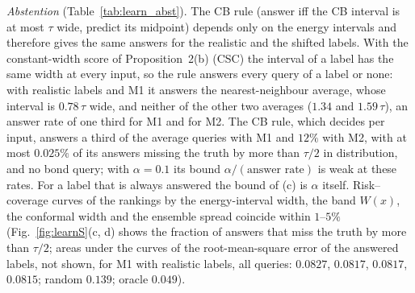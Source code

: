 \documentclass[aps,prx,onecolumn,10pt,nofootinbib,longbibliography,floatfix]{revtex4-2}
\theoremstyle{remark}
\begin{document}
\emph{Abstention} (Table~\ref{tab:learn_abst}). The CB rule (answer iff the CB interval is at most $\tau$ wide,
predict its midpoint) depends only on the energy intervals and therefore gives the same answers for the realistic
and the shifted labels. With the constant-width score of Proposition~2(b) (CSC) the interval of a label has the same %
width at every input, so the rule answers every query of a label or none: with realistic labels and M1 it answers
the nearest-neighbour average, whose interval is $0.78\,\tau$ wide, and neither of the other two averages ($1.34$ %
and $1.59\,\tau$), an answer rate of one third for M1 and for M2. The CB rule, which decides per input, answers a %
third of the average queries with M1 and $12\%$ with M2, with at most $0.025\%$ of its answers missing the truth %
by more than $\tau/2$ in distribution, and no bond query; with $\alpha=0.1$ its bound %
$\alpha/(\text{answer rate})$ is weak at these rates. For a label that is always answered the bound of (c) is
$\alpha$ itself. Risk--coverage curves of the rankings by the energy-interval width, the band $W(x)$, the conformal
width and the ensemble spread coincide within $1$--$5\%$ (Fig.~\ref{fig:learnS}(c, d) shows the fraction of answers %
that miss the truth by more than $\tau/2$; areas under the curves of the root-mean-square error of the answered
labels, not shown, for M1 with realistic labels, all queries: $0.0827$, $0.0817$, $0.0817$, $0.0815$; random $0.139$; oracle $0.049$). %
\end{document}
